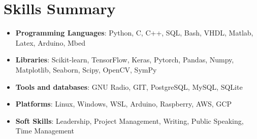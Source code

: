 \documentclass[a4paper,20pt]{article}
\newcommand{\resumeItem}[2]{
  \item\small{
    \textbf{#1}{: #2 \vspace{-2pt}}
  }
}
\newcommand{\resumeSubItem}[2]{\resumeItem{#1}{#2}\vspace{-3pt}}
\newcommand{\resumeSubHeadingListStart}{\begin{itemize}[leftmargin=*]}
\newcommand{\resumeSubHeadingListEnd}{\end{itemize}}
\begin{document}
\section{Skills Summary}
	\resumeSubHeadingListStart
    \resumeSubItem{Programming Languages}{Python, C, C++, SQL, Bash, VHDL, Matlab, Latex, Arduino, Mbed} %
    \resumeSubItem{Libraries}{Scikit-learn, TensorFlow, Keras, Pytorch, Pandas, Numpy, Matplotlib, Seaborn, Scipy, OpenCV, SymPy} %
    \resumeSubItem{Tools and databases}{GNU Radio, GIT, PostgreSQL, MySQL, SQLite} %
    \resumeSubItem{Platforms}{Linux, Windows, WSL, Arduino, Raspberry, AWS, GCP}
    \resumeSubItem{Soft Skills}{Leadership, Project Management, Writing, Public Speaking, Time Management}
  \resumeSubHeadingListEnd

\vspace{-5pt}
\end{document}
